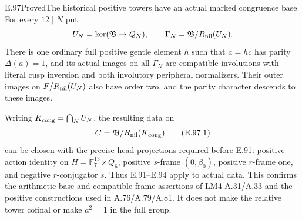 \begin{result}{E.97}{Proved}{The historical positive towers have an actual marked congruence base}
For every \(12\mid N\) put
\[
 U_N=\ker(\mathfrak B\to Q_N),\qquad
 \Gamma_N=\mathfrak B/R_{\rm nil}(U_N).
\]
There is one ordinary full positive gentle element \(h\) such that
\(a=hc\) has parity \(\Delta(a)=1\), and its actual images on
all \(\Gamma_N\) are compatible involutions with literal cusp
inversion and both involutory peripheral normalizers.
Their outer images on \(F/R_{\rm nil}(U_N)\) also have order two,
and the parity character descends to these images.

Writing \(K_{\rm cong}=\bigcap_NU_N\), the resulting data on
\[
 C=\mathfrak B/R_{\rm nil}(K_{\rm cong})
                                                        \tag{E.97.1}
\]
can be chosen with the precise head projections required before
E.91: positive action identity on
\(H=\mathbb F_7^{13}\rtimes Q_6\), positive \(s\)-frame
\((0,\beta_0)\), positive \(r\)-frame one, and negative
\(r\)-conjugator \(s\).
Thus E.91--E.94 apply to actual data.  This confirms the
arithmetic base and compatible-frame assertions of LM4 A.31/A.33
and the positive constructions used in A.76/A.79/A.81.
It does not make the relative tower cofinal or make \(a^2=1\)
in the full group.
\end{result}
